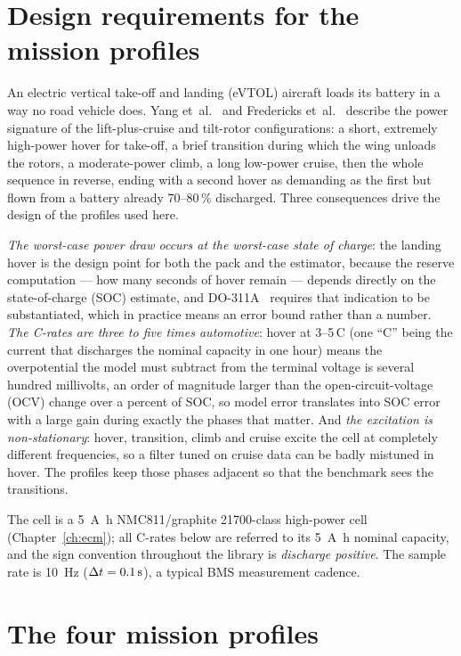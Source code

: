 \section{Design requirements for the mission profiles}

An electric vertical take-off and landing (eVTOL) aircraft loads its battery in a way no road
vehicle does. Yang et~al.~\cite{yang2021evtol} and Fredericks et~al.~\cite{fredericks2018vtol}
describe the power signature of the lift-plus-cruise and tilt-rotor configurations: a short,
extremely high-power hover for take-off, a brief transition during which the wing unloads the
rotors, a moderate-power climb, a long low-power cruise, then the whole sequence in reverse, ending
with a second hover as demanding as the first but flown from a battery already 70--80\,\%
discharged. Three consequences drive the design of the profiles used here.

\emph{The worst-case power draw occurs at the worst-case state of charge}: the landing hover is the
design point for both the pack and the estimator, because the reserve computation --- how many
seconds of hover remain --- depends directly on the state-of-charge (SOC) estimate, and
DO-311A~\cite{rtca2017do311a} requires that indication to be substantiated, which in practice means
an error bound rather than a number. \emph{The C-rates are three to five times automotive}: hover at
3--5\,C (one ``C'' being the current that discharges the nominal capacity in one hour) means the
overpotential the model must subtract from the terminal voltage is several hundred millivolts, an
order of magnitude larger than the open-circuit-voltage (OCV) change over a percent of SOC, so model
error translates into SOC error with a large gain during exactly the phases that matter. And
\emph{the excitation is non-stationary}: hover, transition, climb and cruise excite the cell at
completely different frequencies, so a filter tuned on cruise data can be badly mistuned in hover.
The profiles keep those phases adjacent so that the benchmark sees the transitions.

The cell is a \SI{5}{\ampere\hour} NMC811/graphite 21700-class high-power cell
(Chapter~\ref{ch:ecm}); all C-rates below are referred to its \SI{5}{\ampere\hour} nominal
capacity, and the sign convention throughout the library is \emph{discharge positive}. The sample
rate is \SI{10}{\hertz} ($\Delta t=\SI{0.1}{\second}$), a typical BMS measurement cadence.

\section{The four mission profiles}
\label{sec:ds-profiles}

